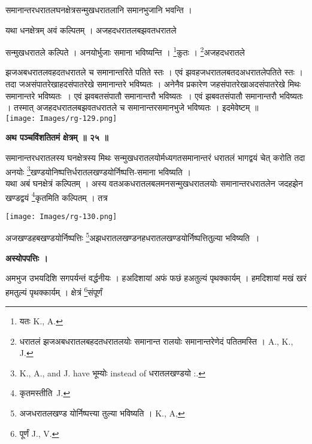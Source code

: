 \documentclass[11pt, openany]{book}
\begin{document}
{\ab समानान्तरधरातलघनक्षेत्रसन्मुखधरातलानि समानभुजानि भवन्ति ।}\\
\vspace{3mm}

यथा धनक्षेत्रम् अवं कल्पितम् । अजहदधरातलबझवतधरातले

\newpage

\noindent सन्मुखधरातले कल्पिते । अनयोर्भुजाः समाना भविष्यन्ति । \renewcommand{\thefootnote}{१}\footnote{यतः {\en K., A.}}कुतः । \renewcommand{\thefootnote}{२}\footnote{धरातलं झजअबधरातलबहदतधरातलयोः समानान्त रालयोः समानान्तरेणेदं पतितमस्ति । {\en A., K., J.} }अजहदधरातले 
 \begin{vwcol}[widths={0.7,0.3}, sep=.8cm, rule=0pt]
झजअबधरातलवहदतधरातले च समानान्तरिते पतिते स्तः । एवं झवहजधरातलबतदअधरातलेपतिते स्तः । तदा जअसंपातरेखाहदसंपातरेखे समानान्तरे भविष्यतः । अनेनैव प्रकारेण जहसंपातरेखाअदसंपातरेखे मिथः समानान्तरे भविष्यतः~। एवं झवबतसंपातौ समानान्तरौ भविष्यतः~। एवं झबवतसंपातौ समानान्तरौ भविष्यतः । तस्मात् अजहदधरातलबझवतधरातले च समानान्तरसमानभुजे भविष्यतः । इदमेवेष्टम् ॥\\
\noindent \texttt{[image: Images/rg-129.png]}
\end{vwcol}

\begin{center}
\textbf{\large अथ पञ्चविंशतितमं क्षेत्रम् ॥ २५ ॥}
\end{center}

{\ab समानान्तरधरातलस्य घनक्षेत्रस्य मिथः सन्मुखधरातलयोर्मध्यगतसमानान्तरं धरातलं भागद्वयं चेत् करोति तदा अनयोः \renewcommand{\thefootnote}{३}\footnote{{\en K., A., and J. have} भूम्योः {\en instead of} धरातलखण्डयो :. }खण्डयोनिष्पत्तिर्धरातलखण्डयोर्निष्पत्ति-समाना
भविष्यति ।}\\

 यथा अबं घनक्षेत्रं कल्पितम् । अस्य वतअकधरातलबलमनसन्मुखधरातलयोः समानान्तरधरातलेन जदहझेन खण्डद्वयं \renewcommand{\thefootnote}{४}\footnote{कृतमस्तीति~{\en J.}}कृतमिति कल्पितम् । तत्र
 \begin{center}
 \noindent \texttt{[image: Images/rg-130.png]}
 \end{center}
अजखण्डहबखण्डयोर्निष्पत्तिः \renewcommand{\thefootnote}{५}\footnote{अजधरातलखण्ड योर्निष्पत्त्या तुल्या भविष्यति । {\en K., A,}}अझधरातलखण्डनहधरातलखण्डयोर्निष्पत्तितुल्या भविष्यति~।
\begin{center}
\textbf{ अस्योपपत्तिः । }
\end{center}

अमभुज उभयदिशि सगपर्यन्तं वर्द्धनीयः । हअदिशायां अफं फछं हअतुल्यं पृथक्कार्यम् । हमदिशायां मखं खरं हमतुल्यं पृथक्कार्यम् । क्षेत्रं \renewcommand{\thefootnote}{६}\footnote{पूर्णं {\en J., V.}}संपूर्णं 
\end{document}
